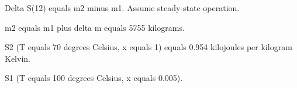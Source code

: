 Delta S(12) equals m2 minus m1.  
Assume steady-state operation.  

m2 equals m1 plus delta m equals 5755 kilograms.  

S2 (T equals 70 degrees Celsius, x equals 1) equals 0.954 kilojoules per kilogram Kelvin.  

S1 (T equals 100 degrees Celsius, x equals 0.005).